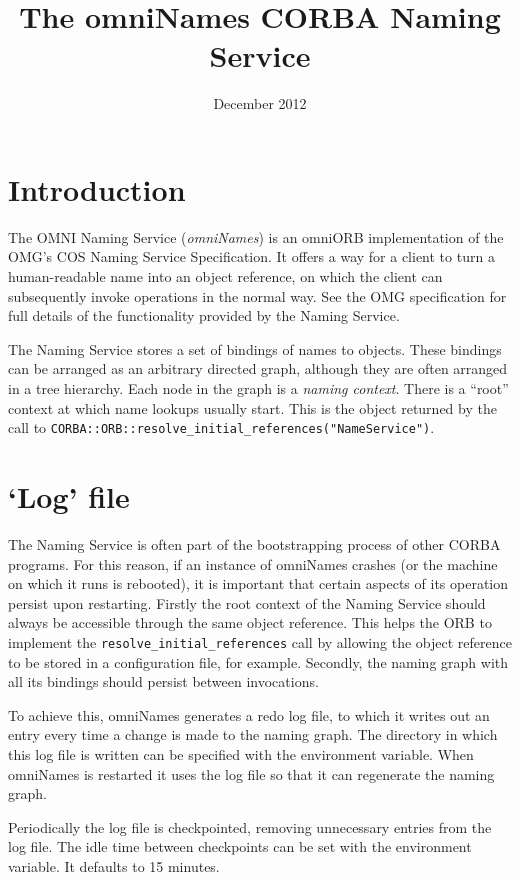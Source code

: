 \documentclass[draft,a4paper,11pt,twoside]{article}
\title{The omniNames CORBA Naming Service}
\date{December 2012}
\newcommand{\code}[1]{\texttt{#1}}
\newcommand{\envvar}{\begingroup \urlstyle{tt}\Url}
\begin{document}
\maketitle

\section{Introduction}

The OMNI Naming Service (\emph{omniNames}) is an omniORB
implementation of the OMG's COS Naming Service Specification.  It
offers a way for a client to turn a human-readable name into an object
reference, on which the client can subsequently invoke operations in
the normal way.  See the OMG specification for full details of the
functionality provided by the Naming Service.

The Naming Service stores a set of bindings of names to objects.
These bindings can be arranged as an arbitrary directed graph,
although they are often arranged in a tree hierarchy.  Each node in
the graph is a \emph{naming context}.  There is a ``root'' context at
which name lookups usually start.  This is the object returned by the
call to \code{CORBA::ORB::resolve\_initial\_references("NameService")}.


\section{`Log' file}

The Naming Service is often part of the bootstrapping process of other
CORBA programs.  For this reason, if an instance of omniNames crashes
(or the machine on which it runs is rebooted), it is important that
certain aspects of its operation persist upon restarting.  Firstly the
root context of the Naming Service should always be accessible through
the same object reference.  This helps the ORB to implement the
\code{resolve\_initial\_references} call by allowing the object
reference to be stored in a configuration file, for example.
Secondly, the naming graph with all its bindings should persist
between invocations.

To achieve this, omniNames generates a redo log file, to which it
writes out an entry every time a change is made to the naming graph.
The directory in which this log file is written can be specified with
the \envvar{OMNINAMES_LOGDIR} environment variable.  When omniNames is
restarted it uses the log file so that it can regenerate the naming
graph.

Periodically the log file is checkpointed, removing unnecessary
entries from the log file.  The idle time between checkpoints can be
set with the \envvar{OMNINAMES_ITBC} environment variable.  It
defaults to 15 minutes.
\end{document}
